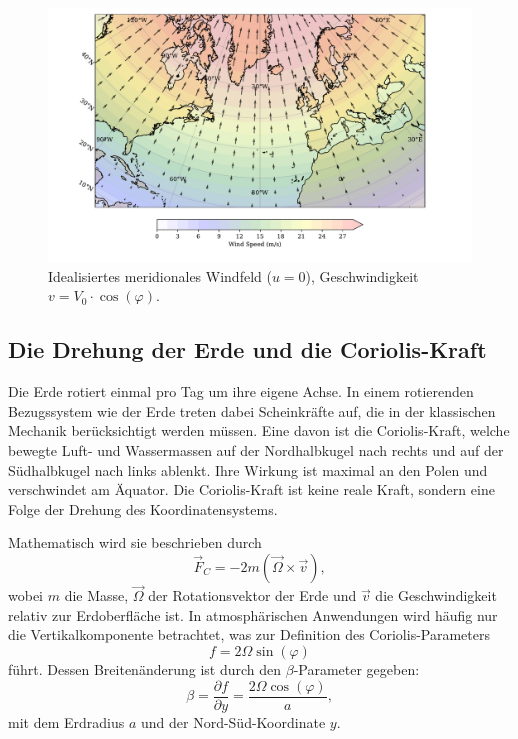 \begin{figure}
	\centering
	\includegraphics[width=\textwidth, trim=1cm 0cm 2cm 0cm, clip]{papers/rossby/images/meridional_wind_plot.pdf}
	\caption{Idealisiertes meridionales Windfeld (\(u=0\)), Geschwindigkeit \(v = V_0 \cdot \cos(\varphi)\).}
	\label{fig:meridional_wind}
\end{figure}

\subsection{Die Drehung der Erde und die Coriolis-Kraft}

Die Erde rotiert einmal pro Tag um ihre eigene Achse. In einem rotierenden
Bezugssystem wie der Erde treten dabei Scheinkräfte auf, die in der klassischen
Mechanik berücksichtigt werden müssen. Eine davon ist die {Coriolis-Kraft},
welche bewegte Luft- und Wassermassen auf der {Nordhalbkugel} nach rechts und
auf der {Südhalbkugel} nach links ablenkt. Ihre Wirkung ist maximal an den
Polen und verschwindet am Äquator. Die Coriolis-Kraft ist keine reale Kraft,
sondern eine Folge der Drehung des Koordinatensystems.

Mathematisch wird sie beschrieben durch
\begin{equation}
	\vec{F}_C = -2m(\vec{\Omega} \times \vec{v}),
	\label{rossby:eq:coriolis_force}
\end{equation}
wobei \(m\) die Masse, \(\vec{\Omega}\) der Rotationsvektor der Erde und \(\vec{v}\) die Geschwindigkeit relativ zur Erdoberfläche ist. In atmosphärischen Anwendungen wird häufig nur die Vertikalkomponente betrachtet, was zur Definition des {Coriolis-Parameters}
\begin{equation}
	f = 2\Omega \sin(\varphi)
	\label{rossby:eq:coriolis_parameter}
\end{equation}
führt. Dessen Breitenänderung ist durch den \(\beta\)-Parameter gegeben:
\begin{equation}
	\beta = \frac{\partial f}{\partial y} = \frac{2 \Omega \cos(\varphi)}{a},
	\label{rossby:eq:beta_parameter}
\end{equation}
mit dem Erdradius \(a\) und der Nord-Süd-Koordinate \(y\).

